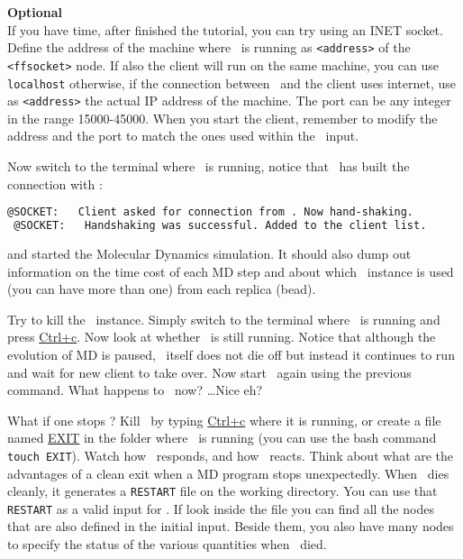 \documentclass{article}
\begin{document}
\begin{Exercise}[label={i-pi},title={PIMD: a client/server approach}]
\textbf{Optional}\\
If you have time, after finished the tutorial, you can
try using an INET socket. Define the address of the machine
where \ipi\ is running as \texttt{<address>} of the
\texttt{<ffsocket>} node. If also the client will run on the same
machine, you can use \texttt{localhost} otherwise, if the connection
between \ipi\ and the client uses internet, use as \texttt{<address>}
the actual IP address of the machine. The port can be any integer
in the range 15000-45000. When you start the client, remember to
modify the address and the port to match the ones used within the \ipi\
input.

\Question
Now switch to the terminal where \ipi\ is running, notice
that \ipi\ has built the connection with \pwx:
\begin{lstlisting}[language=sh]
 @SOCKET:   Client asked for connection from . Now hand-shaking.
 @SOCKET:   Handshaking was successful. Added to the client list.
\end{lstlisting}
and started the Molecular Dynamics simulation.
It should also dump out information on the time cost of each MD step
and about which \pwx\ instance is used (you can have more than one)
from each replica (bead).

\Question
Try to kill the \pwx\ instance.  Simply switch to the
terminal where \pwx\ is running and press \url{Ctrl+c}.  Now look at
whether \ipi\ is still running.  Notice that although the evolution of
MD is paused, \ipi\ itself does not die off but instead it continues to
run and wait for new client to take over.  Now start \pwx\ again using
the previous command.
What happens to \ipi\ now?  \ldots Nice eh?


\Question
What if one stops \ipi ?  Kill \ipi\ by typing \url{Ctrl+c}
where it is running, or create a file named \url{EXIT} in the folder
where \ipi\ is running (you can use the bash command \texttt{touch
  EXIT}).  Watch how \ipi\ responds, and how \pwx\ reacts.  Think
about what are the advantages of a clean exit when a MD program stops
unexpectedly. When \ipi\ dies cleanly, it generates a \texttt{RESTART}
file on the working directory. You can use that \texttt{RESTART} as a
valid input for \ipi. If look inside the file you can find all the
nodes that are also defined in the initial input. Beside them, you
also have many nodes to specify the status of the various quantities
when \ipi\ died.



\end{Exercise}
\end{document}
